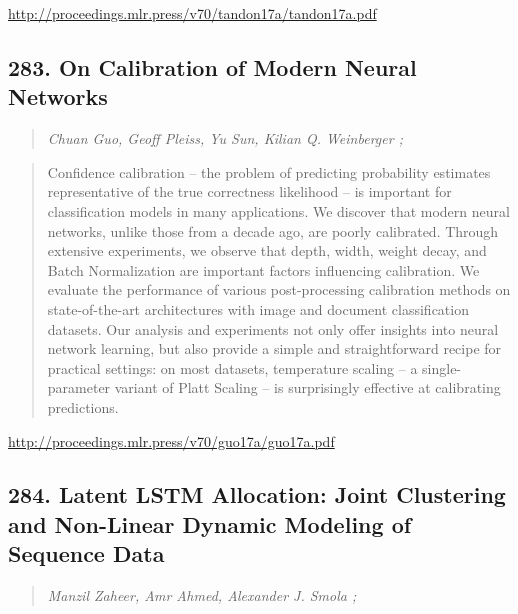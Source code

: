 \documentclass{article}
\begin{document}
\href{http://proceedings.mlr.press/v70/tandon17a/tandon17a.pdf}{http://proceedings.mlr.press/v70/tandon17a/tandon17a.pdf}

\subsection{283. On Calibration of Modern Neural Networks}

\begin{quote}
\footnotesize{\textit{Chuan Guo, Geoff Pleiss, Yu Sun, Kilian Q. Weinberger ;}}
\end{quote}

\begin{quote}
    Confidence calibration – the problem of predicting probability estimates representative of the true correctness likelihood – is important for classification models in many applications. We discover that modern neural networks, unlike those from a decade ago, are poorly calibrated. Through extensive experiments, we observe that depth, width, weight decay, and Batch Normalization are important factors influencing calibration. We evaluate the performance of various post-processing calibration methods on state-of-the-art architectures with image and document classification datasets. Our analysis and experiments not only offer insights into neural network learning, but also provide a simple and straightforward recipe for practical settings: on most datasets, temperature scaling – a single-parameter variant of Platt Scaling – is surprisingly effective at calibrating predictions.  \end{quote}

\href{http://proceedings.mlr.press/v70/guo17a/guo17a.pdf}{http://proceedings.mlr.press/v70/guo17a/guo17a.pdf}

\subsection{284. Latent LSTM Allocation: Joint Clustering and Non-Linear Dynamic Modeling of Sequence Data}

\begin{quote}
\footnotesize{\textit{Manzil Zaheer, Amr Ahmed, Alexander J. Smola ;}}
\end{quote}
\end{document}
